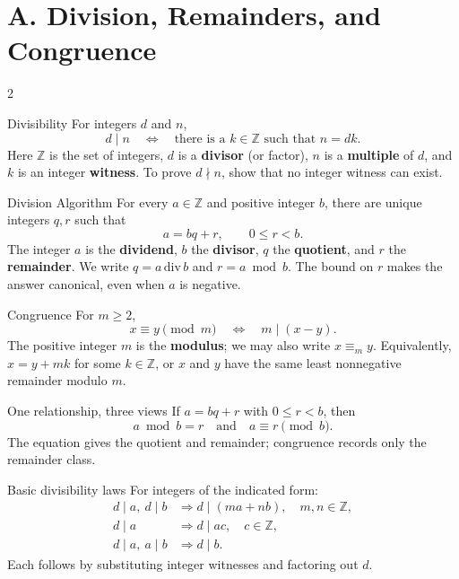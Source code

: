 \documentclass[10pt]{article}
\makeatletter
\let\ps@plain\ps@fancy
\let\ps@empty\ps@fancy
\newcommand{\Z}{\mathbb Z}
\newcommand{\term}[1]{\textbf{\color{DivNavy}#1}}
\newcommand{\equivmod}[1]{\mathrel{\equiv_{#1}}}
\makeatother
\begin{document}
\makeatletter
\let\ps@plain\ps@fancy
\let\ps@empty\ps@fancy
\makeatother
\pagestyle{fancy}

\section*{A. Division, Remainders, and Congruence}

\begin{multicols}{2}
\begin{definitionbox}{Divisibility}
For integers $d$ and $n$,
\[
 d\mid n\quad\Longleftrightarrow\quad
 \text{there is a }k\in\Z\text{ such that }n=dk.
\]
Here $\Z$ is the set of integers, $d$ is a \term{divisor} (or factor), $n$
is a \term{multiple} of $d$, and $k$ is an integer \term{witness}. To prove
$d\nmid n$, show that no integer witness can exist.
\end{definitionbox}

\begin{definitionbox}{Division Algorithm}
For every $a\in\Z$ and positive integer $b$, there are unique integers $q,r$
such that
\[
 a=bq+r,\qquad 0\le r<b.
\]
The integer $a$ is the \term{dividend}, $b$ the \term{divisor}, $q$ the
\term{quotient}, and $r$ the \term{remainder}. We write
$q=a\,\mathrm{div}\,b$ and $r=a\bmod b$. The bound on $r$ makes the answer
canonical, even when $a$ is negative.
\end{definitionbox}

\begin{definitionbox}{Congruence}
For $m\ge2$,
\[
 x\equiv y\pmod m
 \quad\Longleftrightarrow\quad m\mid(x-y).
\]
The positive integer $m$ is the \term{modulus}; we may also write
$x\equivmod{m}y$. Equivalently, $x=y+mk$ for some $k\in\Z$, or $x$ and $y$
have the same least nonnegative remainder modulo $m$.
\end{definitionbox}

\begin{methodbox}{One relationship, three views}
If $a=bq+r$ with $0\le r<b$, then
\[
 a\bmod b=r
 \quad\text{and}\quad
 a\equiv r\pmod b.
\]
The equation gives the quotient and remainder; congruence records only the
remainder class.
\end{methodbox}

\begin{methodbox}{Basic divisibility laws}
For integers of the indicated form:
\[
\begin{array}{ll}
d\mid a,\ d\mid b &\Longrightarrow d\mid(ma+nb),\quad m,n\in\Z,\\
d\mid a &\Longrightarrow d\mid ac,\quad c\in\Z,\\
d\mid a,\ a\mid b &\Longrightarrow d\mid b.
\end{array}
\]
Each follows by substituting integer witnesses and factoring out $d$.
\end{methodbox}



\end{multicols}
\end{document}
